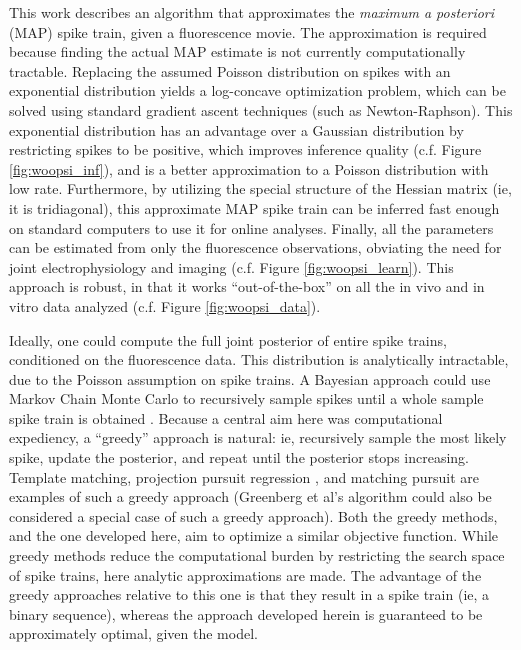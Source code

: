This work describes an algorithm that approximates the \emph{maximum a posteriori} (MAP) spike train, given a fluorescence movie.  The approximation is required because finding the actual MAP estimate is not currently computationally tractable.  Replacing the assumed Poisson distribution on spikes with an exponential distribution yields a log-concave optimization problem, which can be solved using standard gradient ascent techniques (such as Newton-Raphson).  This exponential distribution has an advantage over a Gaussian distribution by restricting spikes to be positive, which improves inference quality (c.f. Figure \ref{fig:woopsi_inf}), and is a better approximation to a Poisson distribution with low rate.  %
Furthermore, by utilizing the special structure of the Hessian matrix (ie, it is tridiagonal), this approximate MAP spike train can be inferred fast enough on standard computers to use it for online analyses.  Finally, all the parameters can be estimated from only the fluorescence observations, obviating the need for joint electrophysiology and imaging (c.f. Figure \ref{fig:woopsi_learn}).  This approach is robust, in that it works ``out-of-the-box'' on all the in vivo and in vitro data analyzed (c.f. Figure \ref{fig:woopsi_data}).

Ideally, one could compute the full joint posterior of entire spike trains, conditioned on the fluorescence data.  This distribution is analytically intractable, due to the Poisson assumption on spike trains.  A Bayesian approach could use Markov Chain Monte Carlo to recursively sample spikes until a whole sample spike train is obtained \cite{AndrieuDoucet01,MishchenkoPaninski09}.  Because a central aim here was computational expediency, a ``greedy'' approach is natural: ie, recursively sample the most likely spike, update the posterior, and repeat until the posterior stops increasing.  Template matching, projection pursuit regression \cite{FS81}, and matching pursuit \cite{MallatZhang93} are examples of such a greedy approach (Greenberg et al's algorithm could also be considered a special case of such a greedy approach).  Both the greedy methods, and the one developed here, aim to optimize a similar objective function.  While greedy methods reduce the computational burden by restricting the search space of spike trains, here analytic approximations are made.  The advantage of the greedy approaches relative to this one is that they result in a spike train (ie, a binary sequence), whereas the approach developed herein is guaranteed to be approximately optimal, given the model.  


